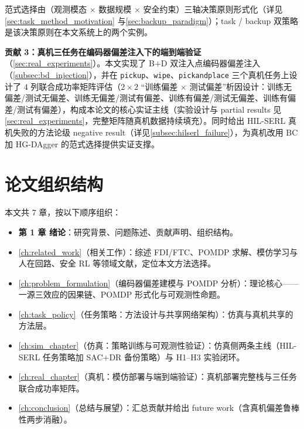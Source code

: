 \noindent 范式选择由（观测模态 $\times$ 数据规模 $\times$ 安全约束）三轴决策原则形式化（详见\cref{sec:task_method_motivation} 与\cref{sec:backup_paradigm}）；task / backup 双策略是该决策原则在本文系统上的两个实例。

\textbf{贡献 3：真机三任务在编码器偏差注入下的端到端验证}（\cref{sec:real_experiments}）。本文实现了 B$+$D 双注入点编码器偏差注入（\cref{subsec:bd_injection}），并在 \texttt{pickup}、\texttt{wipe}、\texttt{pickandplace} 三个真机任务上设计了 $4$ 列联合成功率矩阵评估（$2\times2$ “训练偏差 $\times$ 测试偏差”析因设计：训练无偏差/测试无偏差、训练无偏差/测试有偏差、训练有偏差/测试无偏差、训练有偏差/测试有偏差），构成本论文的核心实证主线（实验设计与 partial results 见\cref{sec:real_experiments}，完整矩阵随真机数据持续填充）。同时给出 HIL-SERL 真机失败的方法论级 negative result（详见\cref{subsec:hilserl_failure}），为真机改用 BC 加 HG-DAgger 的范式选择提供实证支撑。

\section{论文组织结构}\label{sec:organization}

本文共 7 章，按以下顺序组织：

\begin{itemize}
  \item \textbf{第 1 章 绪论}：研究背景、问题陈述、贡献声明、组织结构。
  \item \cref{ch:related_work}（相关工作）：综述 FDI/FTC、POMDP 求解、模仿学习与人在回路、安全 RL 等领域文献，定位本文方法选择。
  \item \cref{ch:problem_formulation}（编码器偏差建模与 POMDP 分析）：理论核心——一源三效应的因果链、POMDP 形式化与可观测性命题。
  \item \cref{ch:task_policy}（任务策略：方法设计与共享网络架构）：仿真与真机共享的方法层。
  \item \cref{ch:sim_chapter}（仿真：策略训练与可观测性验证）：仿真侧两条主线（HIL-SERL 任务策略加 SAC$+$DR 备份策略）与 H1–H3 实验闭环。
  \item \cref{ch:real_chapter}（真机：模仿部署与端到端验证）：真机部署完整栈与三任务联合成功率矩阵。
  \item \cref{ch:conclusion}（总结与展望）：汇总贡献并给出 future work（含真机偏差鲁棒性两步消融）。
\end{itemize}

